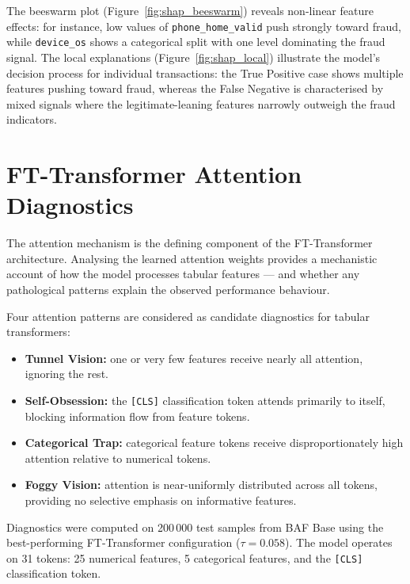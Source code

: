 The beeswarm plot (Figure~\ref{fig:shap_beeswarm}) reveals non-linear feature effects: for instance, low values of \texttt{phone\_home\_valid} push strongly toward fraud, while \texttt{device\_os} shows a categorical split with one level dominating the fraud signal.
The local explanations (Figure~\ref{fig:shap_local}) illustrate the model's decision process for individual transactions: the True Positive case shows multiple features pushing toward fraud, whereas the False Negative is characterised by mixed signals where the legitimate-leaning features narrowly outweigh the fraud indicators.


\clearpage

\section{FT-Transformer Attention Diagnostics}
\label{sec:attention_diagnostics}

The attention mechanism is the defining component of the FT-Transformer architecture. Analysing the learned attention weights provides a mechanistic account of how the model processes tabular features — and whether any pathological patterns explain the observed performance behaviour.

Four attention patterns are considered as candidate diagnostics for tabular transformers:
\begin{itemize}
  \item \textbf{Tunnel Vision:} one or very few features receive nearly all attention, ignoring the rest.
  \item \textbf{Self-Obsession:} the \texttt{[CLS]} classification token attends primarily to itself, blocking information flow from feature tokens.
  \item \textbf{Categorical Trap:} categorical feature tokens receive disproportionately high attention relative to numerical tokens.
  \item \textbf{Foggy Vision:} attention is near-uniformly distributed across all tokens, providing no selective emphasis on informative features.
\end{itemize}

Diagnostics were computed on 200\,000 test samples from BAF Base using the best-performing FT-Transformer configuration ($\tau = 0.058$). The model operates on 31 tokens: 25 numerical features, 5 categorical features, and the \texttt{[CLS]} classification token.

